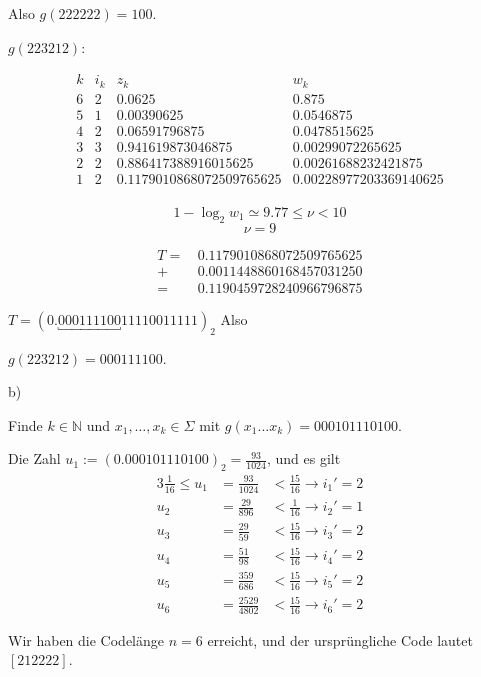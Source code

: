 Also $g(222222) = 100$.

\newpage
$g(223212)$:

\[
\begin{array}{c|c|l|l}
k & i_{k} & z_{k} & w_{k} \\
\hline
6 & 2 & 0.0625 & 0.875 \\
5 & 1 & 0.00390625 & 0.0546875 \\
4 & 2 & 0.06591796875 & 0.0478515625 \\
3 & 3 & 0.941619873046875 & 0.00299072265625 \\
2 & 2 & 0.886417388916015625 & 0.00261688232421875 \\
1 & 2 & 0.1179010868072509765625 & 0.00228977203369140625 \\
\end{array}
\]

\[ 1 - \log_{2} w_{1} \simeq 9.77 \leq \nu < 10 \]
\[ \nu = 9 \]

\begin{align*}
T =\, &0.1179010868072509765625 \\
+\, &0.0011448860168457031250 \\
=\, &0.1190459728240966796875
\end{align*}

$T = (0.\underbracket{000111100}11110011111)_{2}$ Also

$g(223212) = 000111100$.

b)

Finde $k \in \mathbb{N}$ und $x_{1},\dots,x_{k} \in \Sigma$ mit $g(x_{1}\dots x_{k}) = 000101110100$.

Die Zahl $u_{1} := (0.000101110100)_{2} = \frac{93}{1024}$, und es gilt
\begin{alignat*}{3}
\frac{1}{16} \leq u_{1} &= \frac{93}{1024}&< \frac{15}{16} \rightarrow i_{1}' = 2 \\
u_{2} &= \frac{29}{896} &< \frac{1}{16} \rightarrow i_{2}' = 1 \\
u_{3} &= \frac{29}{59} &< \frac{15}{16} \rightarrow i_{3}' = 2 \\
u_{4} &= \frac{51}{98} &< \frac{15}{16} \rightarrow i_{4}' = 2 \\
u_{5} &= \frac{359}{686} &< \frac{15}{16} \rightarrow i_{5}' = 2 \\
u_{6} &= \frac{2529}{4802} &< \frac{15}{16} \rightarrow i_{6}' = 2
\end{alignat*}

Wir haben die Codelänge $n=6$ erreicht, und der ursprüngliche Code lautet $[212222]$.













